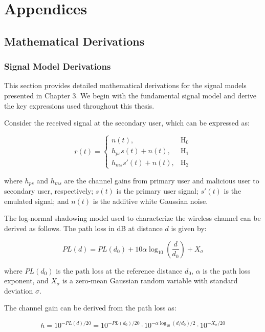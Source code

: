 \chapter{Appendices}

\section{Mathematical Derivations}

\subsection{Signal Model Derivations}
\label{app:signal_derivations}

This section provides detailed mathematical derivations for the signal models presented in Chapter 3. We begin with the fundamental signal model and derive the key expressions used throughout this thesis.

Consider the received signal at the secondary user, which can be expressed as:

\begin{equation}
r(t) = 
\begin{cases}
    n(t), & \text{H}_0 \\
    h_{ps}s(t) + n(t), & \text{H}_1 \\
    h_{ms}s'(t) + n(t), & \text{H}_2
\end{cases}
\end{equation}

where $h_{ps}$ and $h_{ms}$ are the channel gains from primary user and malicious user to secondary user, respectively; $s(t)$ is the primary user signal; $s'(t)$ is the emulated signal; and $n(t)$ is the additive white Gaussian noise.

The log-normal shadowing model used to characterize the wireless channel can be derived as follows. The path loss in dB at distance $d$ is given by:

\begin{equation}
    PL(d) = PL(d_0) + 10\alpha\log_{10}\left(\frac{d}{d_0}\right) + X_\sigma
\end{equation}

where $PL(d_0)$ is the path loss at the reference distance $d_0$, $\alpha$ is the path loss exponent, and $X_\sigma$ is a zero-mean Gaussian random variable with standard deviation $\sigma$.

The channel gain can be derived from the path loss as:

\begin{equation}
    h = 10^{-PL(d)/20} = 10^{-PL(d_0)/20} \cdot 10^{-\alpha\log_{10}(d/d_0)/2} \cdot 10^{-X_\sigma/20}
\end{equation}

